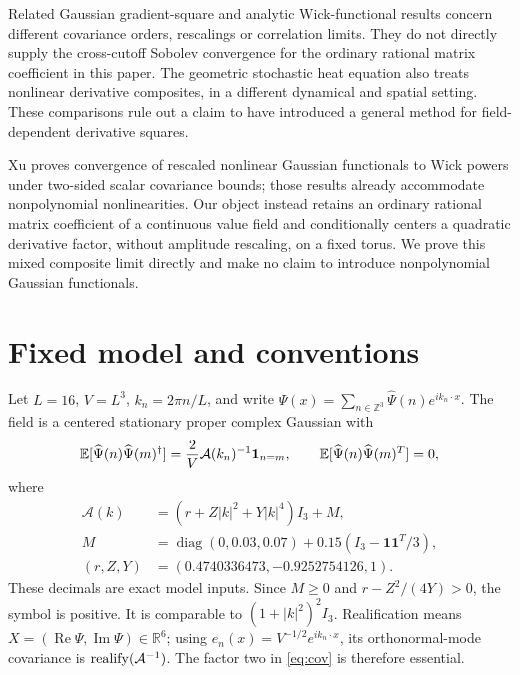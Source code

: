 \documentclass[11pt]{article}
\newcommand{\E}{\mathbb E}
\newcommand{\R}{\mathbb R}
\begin{document}
Related Gaussian gradient-square and analytic Wick-functional results
\cite{CRS,CHRR} concern different covariance orders, rescalings or
correlation limits. They do not directly supply the cross-cutoff Sobolev
convergence for the ordinary rational matrix coefficient in this paper.
The geometric stochastic heat equation \cite{BGHZ} also treats nonlinear
derivative composites, in a different dynamical and spatial setting.
These comparisons rule out a claim to have introduced a general method
for field-dependent derivative squares.

Xu \cite{Xu} proves convergence of rescaled nonlinear Gaussian functionals
to Wick powers under two-sided scalar covariance bounds; those results already
accommodate nonpolynomial nonlinearities. Our object instead retains an
ordinary rational matrix coefficient of a continuous value field and
conditionally centers a quadratic derivative factor, without amplitude
rescaling, on a fixed torus. We prove this mixed composite limit directly
and make no claim to introduce nonpolynomial Gaussian functionals.

\section{Fixed model and conventions}
Let $L=16$, $V=L^3$, $k_n=2\pi n/L$, and write
$\Psi(x)=\sum_{n\in\mathbb Z^3}\widehat\Psi(n)e^{ik_n\cdot x}$.
The field is a centered stationary proper complex Gaussian with
\begin{equation}\label{eq:cov}
 \E[\widehat\Psi(n)\widehat\Psi(m)^\dagger]
 =\frac{2}{V}{\cal A}(k_n)^{-1}\mathbf1_{n=m},\qquad
 \E[\widehat\Psi(n)\widehat\Psi(m)^T]=0,
\end{equation}
where
\begin{align}
 \mathcal A(k)&=(r+Z|k|^2+Y|k|^4)I_3+M,\label{eq:symbol}\\
 M&=\operatorname{diag}(0,0.03,0.07)
       +0.15(I_3-\bm1\bm1^T/3),\nonumber\\
 (r,Z,Y)&=(0.4740336473,-0.9252754126,1).\nonumber
\end{align}
These decimals are exact model inputs. Since $M\ge0$ and
$r-Z^2/(4Y)>0$, the symbol is positive. It is comparable to
$(1+|k|^2)^2I_3$. Realification means
$X=(\operatorname{Re}\Psi,\operatorname{Im}\Psi)\in\R^6$;
using $e_n(x)=V^{-1/2}e^{ik_n\cdot x}$, its orthonormal-mode covariance is $\operatorname{realify}({\cal A}^{-1})$.
The factor two in \eqref{eq:cov} is therefore essential.
\end{document}
